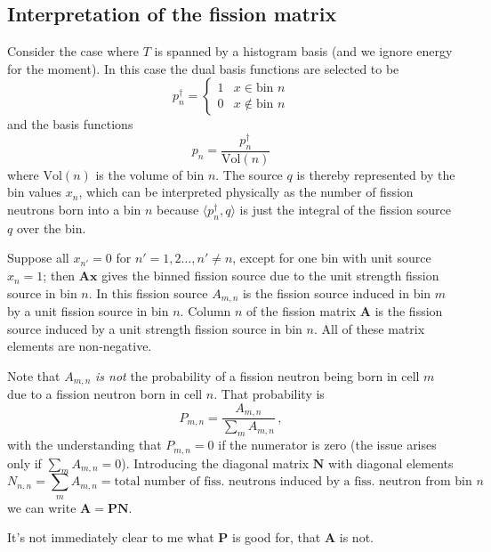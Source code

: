 \documentclass[11pt,onecolumn]{article}
\newcommand{\FM}{\mathbf{A}}
\newcommand{\x}{\mathbf{x}}
\begin{document}
\subsection{Interpretation of the fission matrix}

Consider the case where $T$ is spanned by a histogram basis (and we ignore energy for the moment). In this case the dual basis functions are selected to be
\begin{equation}
 p_n^\dagger = 
 \begin{cases} 
   1 & x \in \text{bin $n$}\\
   0 & x \notin \text{bin $n$}
 \end{cases}
\end{equation} 
and the basis functions
\begin{equation}
 p_n = \frac{p_n^\dagger}{\text{Vol}(n)}
\end{equation} 
where $\text{Vol}(n)$ is the volume of bin $n$. The source $q$ is thereby represented by the bin values $x_n$, which can be interpreted physically as the number of fission neutrons born into a bin $n$ because $\langle p_n^\dagger, q\rangle$ is just the integral of the fission source $q$ over the bin.  

Suppose all $x_{n'} = 0$ for $n' = 1, 2 \ldots, n' \ne n $, except for one bin with unit source $x_n = 1$; then $\FM \x$ gives the binned fission source due to the unit strength fission source in bin $n$.  In this fission source $A_{m,n}$ is the fission source induced in bin $m$ by a unit fission source in bin $n$. Column $n$ of the fission matrix $\FM$ is the fission source induced by a unit strength fission source in bin $n$.  All of these matrix elements are non-negative.

Note that $A_{m,n}$ \emph{is not} the probability of a fission neutron being born in cell $m$ due to a fission neutron born in cell $n$.   That probability is
\begin{equation}
P_{m,n} = \frac{A_{m,n}}{\sum_m A_{m,n}} \,,
\end{equation}
with the understanding that $P_{m,n} = 0$ if the numerator is zero (the issue arises only if $\sum_m A_{m,n} = 0$).
Introducing the diagonal matrix $\mathbf{N}$ with diagonal elements
\begin{equation}
N_{n,n} = {\sum_m A_{m,n}} = \text{total number of fiss. neutrons induced by a fiss. neutron from bin $n$}
\end{equation}
we can write $\FM = \mathbf{P} \mathbf{N}$.  

It's not immediately clear to me what $\mathbf{P}$ is good for, that $\FM$ is not.
\end{document}
